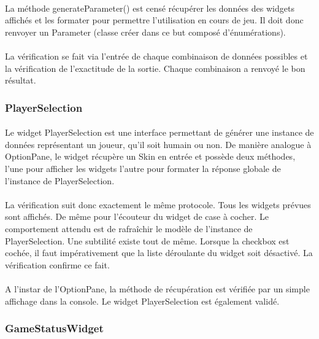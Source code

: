 \documentclass[11pt]{article} %
\begin{document}
\begin{sffamily}
\paragraph{}
La méthode generateParameter() est censé récupérer les données des widgets affichés et les formater pour permettre l'utilisation en cours de jeu. Il doit donc renvoyer un Parameter (classe créer dans ce but composé d'énumérations). 
\paragraph{}
La vérification se fait via l'entrée de chaque combinaison de données possibles et la vérification de l'exactitude de la sortie. Chaque combinaison a renvoyé le bon résultat. 

\subsubsection{PlayerSelection}
\paragraph{}
Le widget PlayerSelection est une interface permettant de générer une instance de données représentant un joueur, qu'il soit humain ou non. De manière analogue à OptionPane, le widget récupère un Skin en entrée et possède deux méthodes, l'une pour afficher les widgets l'autre pour formater la réponse globale de l'instance de PlayerSelection.
\paragraph{}
La vérification suit donc exactement le même protocole. Tous les widgets prévues sont affichés. De même pour l'écouteur du widget de case à cocher. Le comportement attendu est de rafraîchir le modèle de l'instance de PlayerSelection. Une subtilité existe tout de même. Lorsque la checkbox est cochée, il faut impérativement que la liste déroulante du widget soit désactivé. La vérification confirme ce fait.
\paragraph{}
A l'instar de l'OptionPane, la méthode de récupération est vérifiée par un simple affichage dans la console. Le widget PlayerSelection est également validé.

\subsubsection{GameStatusWidget}

\end{sffamily}
\end{document}
